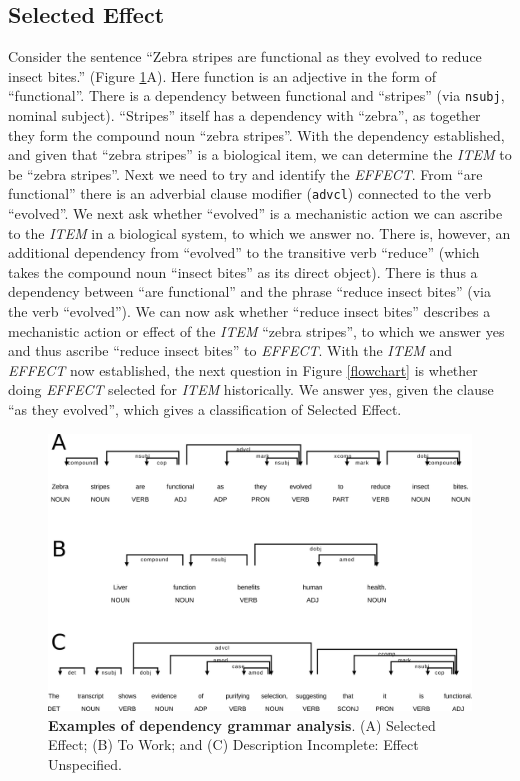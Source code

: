\documentclass{article}
\begin{document}
\subsection{Selected Effect}
\label{sec:selected-effect}

Consider the sentence ``Zebra stripes are functional as they evolved to reduce insect bites.'' (Figure \ref{seleff_towork_effunsp}A).
Here function is an adjective in the form of ``functional''.
There is a dependency between functional and ``stripes'' (via \texttt{nsubj}, nominal subject).
``Stripes'' itself has a dependency with ``zebra'', as together they form the compound noun ``zebra stripes''.
With the dependency established, and given that ``zebra stripes'' is a biological item, we can determine the \emph{ITEM} to be ``zebra stripes''.
Next we need to try and identify the \emph{EFFECT}.
From ``are functional'' there is an adverbial clause modifier (\texttt{advcl}) connected to the verb ``evolved''.
We next ask whether ``evolved'' is a mechanistic action we can ascribe to the \emph{ITEM} in a biological system, to which we answer no.
There is, however, an additional dependency from ``evolved'' to the transitive verb ``reduce'' (which takes the compound noun ``insect bites'' as its direct object).
There is thus a dependency between ``are functional'' and the phrase ``reduce insect bites'' (via the verb ``evolved'').
We can now ask whether ``reduce insect bites'' describes a mechanistic action or effect of the \emph{ITEM} ``zebra stripes'', to which we answer yes and thus ascribe ``reduce insect bites'' to \emph{EFFECT}.
With the \emph{ITEM} and \emph{EFFECT} now established, the next question in Figure \ref{flowchart} is whether doing \emph{EFFECT} selected for \emph{ITEM} historically.
We answer yes, given the clause ``as they evolved'', which gives a classification of Selected Effect.


\begin{figure}[ht]
  \centering
  \includegraphics[width=\linewidth]{figures/combined_seleff_towork_effunsp.png}
  \caption[]{\textbf{Examples of dependency grammar analysis}. (A) Selected Effect; (B) To Work; and (C) Description Incomplete: Effect Unspecified.}
  \label{seleff_towork_effunsp}
\end{figure}
\end{document}
